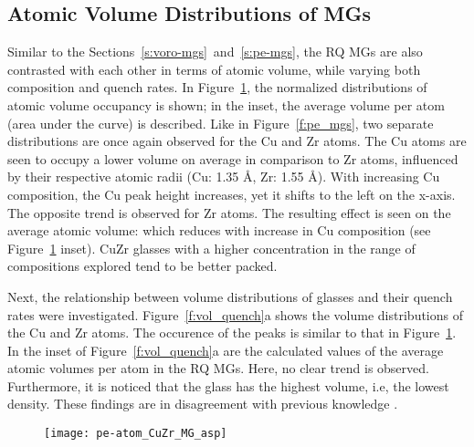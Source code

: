 \subsection{Atomic Volume Distributions of MGs}  \label{s:vol-mgs}
Similar to the Sections~\ref{s:voro-mgs}~and~\ref{s:pe-mgs}, the RQ MGs are also contrasted with each other in terms of atomic volume, while varying both composition and quench rates. In Figure~\ref{f:vol_comp}, the normalized distributions of atomic volume occupancy is shown; in the inset, the average volume per atom (area under the curve) is described. Like in Figure~\ref{f:pe_mgs}, two separate distributions are once again observed for the Cu and Zr atoms. The Cu atoms are seen to occupy a lower volume on average in comparison to Zr atoms, influenced by their respective atomic radii (Cu: 1.35 \r{A}, Zr: 1.55 \r{A}). With increasing Cu composition, the Cu peak height increases, yet it shifts to the left on the x-axis. The opposite trend is observed for Zr atoms. The resulting effect is seen on the average atomic volume: which reduces with increase in Cu composition (see Figure~\ref{f:vol_comp} inset). CuZr glasses with a higher concentration in the range of compositions explored tend to be better packed. \par

Next, the relationship between volume distributions of \cz  glasses and their quench rates were investigated. Figure~\ref{f:vol_quench}a shows the volume distributions of the Cu and Zr atoms. The occurence of the peaks is similar to that in Figure~\ref{f:vol_comp}. In the inset of Figure~\ref{f:vol_quench}a are the calculated values of the average atomic volumes per atom in the RQ MGs. Here, no clear trend is observed. Furthermore, it is noticed that the  glass has the highest volume, i.e, the lowest density. These findings are in disagreement with previous knowledge \cite{Berthier2016,Yue2018}. \par

\begin{figure}
	\centering
	\texttt{[image: pe-atom\_CuZr\_MG\_asp]}
	\label{f:vol_comp}
\end{figure}

